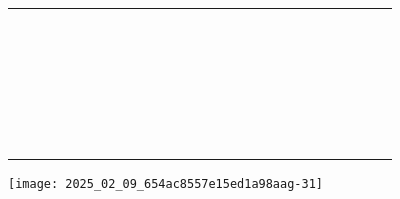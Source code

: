 \documentclass[10pt]{article}
\begin{document}
\begin{center}
\begin{tabular}{|c|c|c|c|c|c|c|c|c|c|c|c|c|c|c|c|c|c|c|c|c|c|c|c|}
\hline
 &  &  &  &  &  &  &  &  &  &  &  &  &  &  &  &  &  &  &  &  &  &  &  \\
\hline
 &  &  &  &  &  &  &  &  &  &  &  &  &  &  &  &  &  &  &  &  &  &  &  \\
\hline
 &  &  &  &  &  &  &  &  &  &  &  &  &  &  &  &  &  &  &  &  &  &  &  \\
\hline
 &  &  &  &  &  &  &  &  &  &  &  &  &  &  &  &  &  &  &  &  &  &  &  \\
\hline
 &  &  &  &  &  &  &  &  &  &  &  &  &  &  &  &  &  &  &  &  &  &  &  \\
\hline
 &  &  &  &  &  &  &  &  &  &  &  &  &  &  &  &  &  &  &  &  &  &  &  \\
\hline
 &  &  &  &  &  &  &  &  &  &  &  &  &  &  &  &  &  &  &  &  &  &  &  \\
\hline
 &  &  &  &  &  &  &  &  &  &  &  &  &  &  &  &  &  &  &  &  &  &  &  \\
\hline
 &  &  &  &  &  &  &  &  &  &  &  &  &  &  &  &  &  &  &  &  &  &  &  \\
\hline
 &  &  &  &  &  &  &  &  &  &  &  &  &  &  &  &  &  &  &  &  &  &  &  \\
\hline
 &  &  &  &  &  &  &  &  &  &  &  &  &  &  &  &  &  &  &  &  &  &  &  \\
\hline
 &  &  &  &  &  &  &  &  &  &  &  &  &  &  &  &  &  &  &  &  &  &  &  \\
\hline
 &  &  &  &  &  &  &  &  &  &  &  &  &  &  &  &  &  &  &  &  &  &  &  \\
\hline
 &  &  &  &  &  &  &  &  &  &  &  &  &  &  &  &  &  &  &  &  &  &  &  \\
\hline
 &  &  &  &  &  &  &  &  &  &  &  &  &  &  &  &  &  &  &  &  &  &  &  \\
\hline
 &  &  &  &  &  &  &  &  &  &  &  &  &  &  &  &  &  &  &  &  &  &  &  \\
\hline
 &  &  &  &  &  &  &  &  &  &  &  &  &  &  &  &  &  &  &  &  &  &  &  \\
\hline
 &  &  &  &  &  &  &  &  &  &  &  &  &  &  &  &  &  &  &  &  &  &  &  \\
\hline
 &  &  &  &  &  &  &  &  &  &  &  &  &  &  &  &  &  &  &  &  &  &  &  \\
\hline
 &  &  &  &  &  &  &  &  &  &  &  &  &  &  &  &  &  &  &  &  &  &  &  \\
\hline
 &  &  &  &  &  &  &  &  &  &  &  &  &  &  &  &  &  &  &  &  &  &  &  \\
\hline
 &  &  &  &  &  &  &  &  &  &  &  &  &  &  &  &  &  &  &  &  &  &  &  \\
\hline
 &  &  &  &  &  &  &  &  &  &  &  &  &  &  &  &  &  &  &  &  &  &  &  \\
\hline
 &  &  &  &  &  &  &  &  &  &  &  &  &  &  &  &  &  &  &  &  &  &  &  \\
\hline
 &  &  &  &  &  &  &  &  &  &  &  &  &  &  &  &  &  &  &  &  &  &  &  \\
\hline
 &  &  &  &  &  &  &  &  &  &  &  &  &  &  &  &  &  &  &  &  &  &  &  \\
\hline
\end{tabular}
\end{center}

\begin{center}
\texttt{[image: 2025\_02\_09\_654ac8557e15ed1a98aag-31]}
\end{center}
\end{document}
